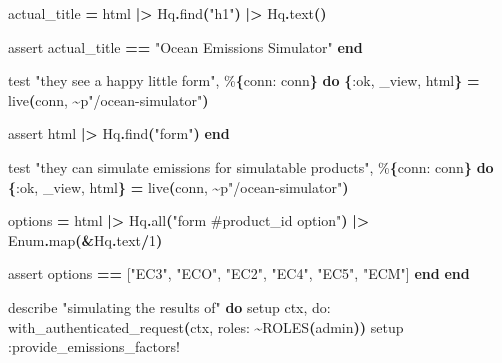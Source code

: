 \documentclass[11pt,a4paper,greek,twoside]{template-xe}
\newenvironment{Shaded}{\begin{english}\begin{snugshade}}{\end{snugshade}\end{english}}
\newcommand{\ConstantTok}[1]{\textcolor[rgb]{0.56,0.35,0.01}{#1}}
\newcommand{\DecValTok}[1]{\textcolor[rgb]{0.00,0.00,0.81}{#1}}
\newcommand{\FunctionTok}[1]{\textcolor[rgb]{0.13,0.29,0.53}{\textbf{#1}}}
\newcommand{\KeywordTok}[1]{\textcolor[rgb]{0.13,0.29,0.53}{\textbf{#1}}}
\newcommand{\NormalTok}[1]{#1}
\newcommand{\OperatorTok}[1]{\textcolor[rgb]{0.81,0.36,0.00}{\textbf{#1}}}
\newcommand{\OtherTok}[1]{\textcolor[rgb]{0.56,0.35,0.01}{#1}}
\newcommand{\StringTok}[1]{\textcolor[rgb]{0.31,0.60,0.02}{#1}}
\newcommand{\VariableTok}[1]{\textcolor[rgb]{0.00,0.00,0.00}{#1}}
\begin{document}
\begin{Shaded}
\begin{Highlighting}[]
\NormalTok{      actual\_title }\OperatorTok{=}\NormalTok{ html }\OperatorTok{|\textgreater{}} \ConstantTok{Hq}\OperatorTok{.}\NormalTok{find}\FunctionTok{(}\StringTok{"h1"}\FunctionTok{)} \OperatorTok{|\textgreater{}} \ConstantTok{Hq}\OperatorTok{.}\NormalTok{text}\FunctionTok{()}

\NormalTok{      assert actual\_title }\OperatorTok{==} \StringTok{"Ocean Emissions Simulator"}
    \KeywordTok{end}

\NormalTok{    test }\StringTok{"they see a happy little form"}\NormalTok{, \%}\FunctionTok{\{}\VariableTok{conn:}\NormalTok{ conn}\FunctionTok{\}} \KeywordTok{do}
      \FunctionTok{\{}\VariableTok{:ok}\NormalTok{, \_view, html}\FunctionTok{\}} \OperatorTok{=}\NormalTok{ live}\FunctionTok{(}\NormalTok{conn, }\OperatorTok{\textasciitilde{}}\NormalTok{p}\StringTok{"/ocean{-}simulator"}\FunctionTok{)}

\NormalTok{      assert html }\OperatorTok{|\textgreater{}} \ConstantTok{Hq}\OperatorTok{.}\NormalTok{find}\FunctionTok{(}\StringTok{"form"}\FunctionTok{)}
    \KeywordTok{end}

\NormalTok{    test }\StringTok{"they can simulate emissions for simulatable products"}\NormalTok{, \%}\FunctionTok{\{}\VariableTok{conn:}\NormalTok{ conn}\FunctionTok{\}} \KeywordTok{do}
      \FunctionTok{\{}\VariableTok{:ok}\NormalTok{, \_view, html}\FunctionTok{\}} \OperatorTok{=}\NormalTok{ live}\FunctionTok{(}\NormalTok{conn, }\OperatorTok{\textasciitilde{}}\NormalTok{p}\StringTok{"/ocean{-}simulator"}\FunctionTok{)}

\NormalTok{      options }\OperatorTok{=}\NormalTok{ html }\OperatorTok{|\textgreater{}} \ConstantTok{Hq}\OperatorTok{.}\NormalTok{all}\FunctionTok{(}\StringTok{"form \#product\_id option"}\FunctionTok{)} \OperatorTok{|\textgreater{}} \ConstantTok{Enum}\OperatorTok{.}\NormalTok{map}\FunctionTok{(}\OperatorTok{\&}\ConstantTok{Hq}\OperatorTok{.}\NormalTok{text}\OperatorTok{/}\DecValTok{1}\FunctionTok{)}

\NormalTok{      assert options }\OperatorTok{==} \OtherTok{[}\StringTok{"EC3"}\NormalTok{, }\StringTok{"ECO"}\NormalTok{, }\StringTok{"EC2"}\NormalTok{, }\StringTok{"EC4"}\NormalTok{, }\StringTok{"EC5"}\NormalTok{, }\StringTok{"ECM"}\OtherTok{]}
    \KeywordTok{end}
  \KeywordTok{end}

\NormalTok{  describe }\StringTok{"simulating the results of"} \KeywordTok{do}
\NormalTok{    setup ctx, }\VariableTok{do:}\NormalTok{ with\_authenticated\_request}\FunctionTok{(}\NormalTok{ctx, }\VariableTok{roles:} \OperatorTok{\textasciitilde{}}\ConstantTok{ROLES}\FunctionTok{(}\NormalTok{admin}\FunctionTok{))}
\NormalTok{    setup }\VariableTok{:provide\_emissions\_factors!}


\end{Highlighting}
\end{Shaded}
\end{document}
